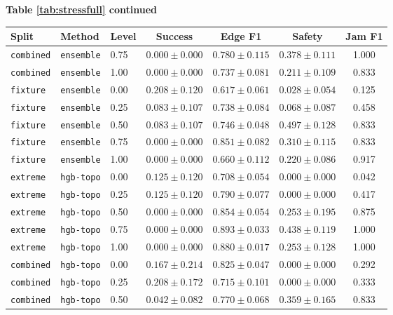\documentclass{article}
\begin{document}
\begin{center}
\textbf{Table \ref{tab:stressfull} continued}\\[0.4ex]
\begin{tabular}{lllcccc}
\toprule
Split & Method & Level & Success & Edge F1 & Safety & Jam F1 \\
\midrule
\texttt{combined} & \texttt{ensemble} & 0.75 & $0.000 \pm 0.000$ & $0.780 \pm 0.115$ & $0.378 \pm 0.111$ & 1.000 \\
\texttt{combined} & \texttt{ensemble} & 1.00 & $0.000 \pm 0.000$ & $0.737 \pm 0.081$ & $0.211 \pm 0.109$ & 0.833 \\
\texttt{fixture} & \texttt{ensemble} & 0.00 & $0.208 \pm 0.120$ & $0.617 \pm 0.061$ & $0.028 \pm 0.054$ & 0.125 \\
\texttt{fixture} & \texttt{ensemble} & 0.25 & $0.083 \pm 0.107$ & $0.738 \pm 0.084$ & $0.068 \pm 0.087$ & 0.458 \\
\texttt{fixture} & \texttt{ensemble} & 0.50 & $0.083 \pm 0.107$ & $0.746 \pm 0.048$ & $0.497 \pm 0.128$ & 0.833 \\
\texttt{fixture} & \texttt{ensemble} & 0.75 & $0.000 \pm 0.000$ & $0.851 \pm 0.082$ & $0.310 \pm 0.115$ & 0.833 \\
\texttt{fixture} & \texttt{ensemble} & 1.00 & $0.000 \pm 0.000$ & $0.660 \pm 0.112$ & $0.220 \pm 0.086$ & 0.917 \\
\texttt{extreme} & \texttt{hgb-topo} & 0.00 & $0.125 \pm 0.120$ & $0.708 \pm 0.054$ & $0.000 \pm 0.000$ & 0.042 \\
\texttt{extreme} & \texttt{hgb-topo} & 0.25 & $0.125 \pm 0.120$ & $0.790 \pm 0.077$ & $0.000 \pm 0.000$ & 0.417 \\
\texttt{extreme} & \texttt{hgb-topo} & 0.50 & $0.000 \pm 0.000$ & $0.854 \pm 0.054$ & $0.253 \pm 0.195$ & 0.875 \\
\texttt{extreme} & \texttt{hgb-topo} & 0.75 & $0.000 \pm 0.000$ & $0.893 \pm 0.033$ & $0.438 \pm 0.119$ & 1.000 \\
\texttt{extreme} & \texttt{hgb-topo} & 1.00 & $0.000 \pm 0.000$ & $0.880 \pm 0.017$ & $0.253 \pm 0.128$ & 1.000 \\
\texttt{combined} & \texttt{hgb-topo} & 0.00 & $0.167 \pm 0.214$ & $0.825 \pm 0.047$ & $0.000 \pm 0.000$ & 0.292 \\
\texttt{combined} & \texttt{hgb-topo} & 0.25 & $0.208 \pm 0.172$ & $0.715 \pm 0.101$ & $0.000 \pm 0.000$ & 0.333 \\
\texttt{combined} & \texttt{hgb-topo} & 0.50 & $0.042 \pm 0.082$ & $0.770 \pm 0.068$ & $0.359 \pm 0.165$ & 0.833 \\

\end{tabular}
\end{center}
\end{document}
